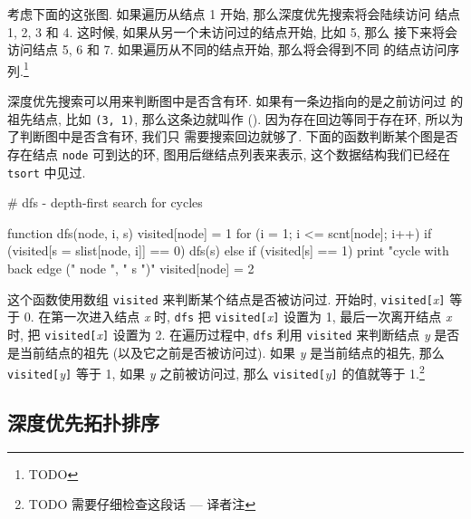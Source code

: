 考虑下面的这张图. 如果遍历从结点 1 开始, 那么深度优先搜索将会陆续访问
结点 1, 2, 3 和 4. 这时候, 如果从另一个未访问过的结点开始, 比如 5, 那么 
接下来将会访问结点 5, 6 和 7. 如果遍历从不同的结点开始, 那么将会得到不同
的结点访问序列.\footnote{TODO}

深度优先搜索可以用来判断图中是否含有环. 如果有一条边指向的是之前访问过
的祖先结点, 比如 \texttt{(3, 1)}, 那么这条边就叫作 (). 因为存在回边等同于存在环, 所以为了判断图中是否含有环, 我们只 
需要搜索回边就够了. 下面的函数判断某个图是否存在结点 \texttt{node} 
可到达的环, 图用后继结点列表来表示, 这个数据结构我们已经在 \texttt{tsort}
中见过.
\begin{awkcode}
    # dfs - depth-first search for cycles

    function dfs(node,     i, s) {
        visited[node] = 1
        for (i = 1; i <= scnt[node]; i++)
            if (visited[s = slist[node, i]] == 0)
                dfs(s)
            else if (visited[s] == 1)
                print "cycle with back edge (" node ", " s ")" 
        visited[node] = 2
    }
\end{awkcode}

这个函数使用数组 \texttt{visited} 来判断某个结点是否被访问过. 开始时,
\texttt{visited[}\textit{x}\texttt{]} 等于 0. 在第一次进入结点 \textit{x}
时, \texttt{dfs} 把 \texttt{visited[}\textit{x}\texttt{]} 设置为 1,
最后一次离开结点 \textit{x} 时, 把 \texttt{visited[}\textit{x}\texttt{]}
设置为 2. 在遍历过程中, \texttt{dfs} 利用 \texttt{visited} 来判断结点
\textit{y} 是否是当前结点的祖先 (以及它之前是否被访问过). 如果 \textit{y}
是当前结点的祖先, 那么 \texttt{visited[}\textit{y}\texttt{]} 等于 1,
如果 \textit{y} 之前被访问过, 那么 \texttt{visited[}\textit{y}\texttt{]} 
的值就等于 1.\footnote{TODO 需要仔细检查这段话 --- 译者注}

\subsection{深度优先拓扑排序}
\label{subsec:depth_first_topological_sort}

